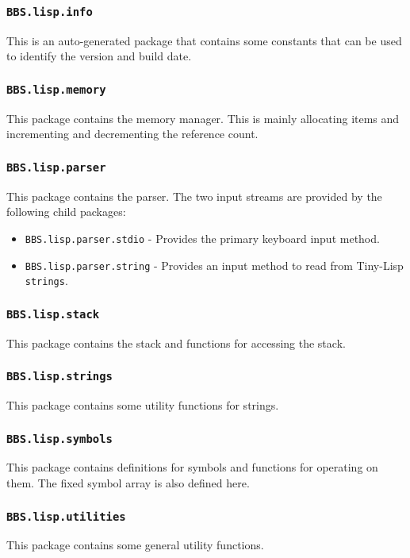 \documentclass[10pt, openany]{book}
\newcommand{\package}[1]{\texttt{#1}}
\newcommand{\datatype}[1]{\texttt{#1}}
\newcommand{\tl}{Tiny-Lisp}
\begin{document}
\subsubsection{\package{BBS.lisp.info}}
This is an auto-generated package that contains some constants that can be used to identify the version and build date.

\subsubsection{\package{BBS.lisp.memory}}
This package contains the memory manager.  This is mainly allocating items and incrementing and decrementing the reference count.

\subsubsection{\package{BBS.lisp.parser}}
This package contains the parser.  The two input streams are provided by the following child packages:
\begin{itemize}
  \item \package{BBS.lisp.parser.stdio} - Provides the primary keyboard input method.
  \item \package{BBS.lisp.parser.string} - Provides an input method to read from \tl{} \datatype{strings}.
\end{itemize}

\subsubsection{\package{BBS.lisp.stack}}
This package contains the stack and functions for accessing the stack.

\subsubsection{\package{BBS.lisp.strings}}
This package contains some utility functions for strings.

\subsubsection{\package{BBS.lisp.symbols}}
This package contains definitions for symbols and functions for operating on them.  The fixed symbol array is also defined here.

\subsubsection{\package{BBS.lisp.utilities}}
This package contains some general utility functions.
\end{document}
